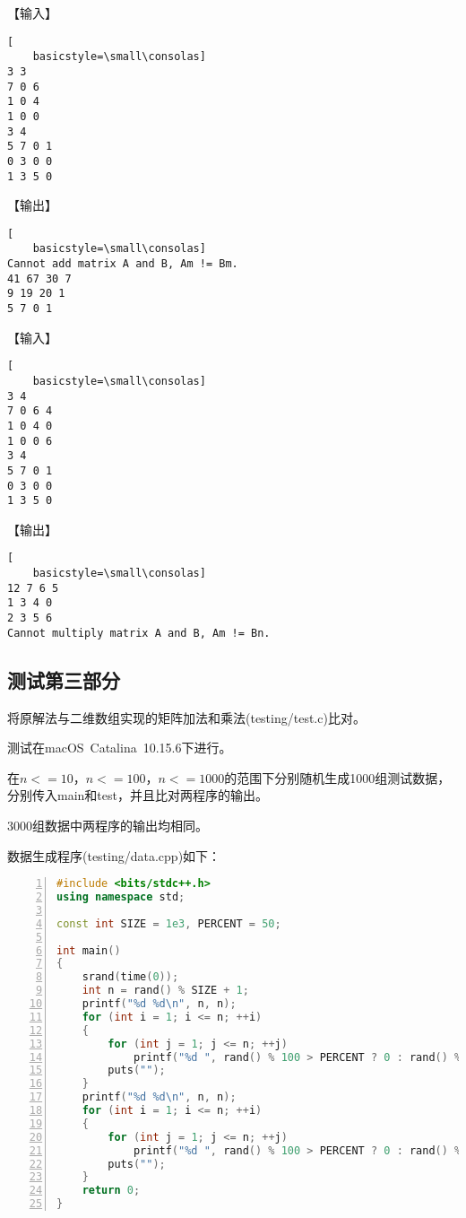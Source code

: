 \documentclass{article}
\begin{document}
【输入】

\begin{lstlisting}[
    basicstyle=\small\consolas]
3 3
7 0 6
1 0 4
1 0 0
3 4
5 7 0 1
0 3 0 0
1 3 5 0
\end{lstlisting}

【输出】

\begin{lstlisting}[
    basicstyle=\small\consolas]
Cannot add matrix A and B, Am != Bm.
41 67 30 7 
9 19 20 1 
5 7 0 1 
\end{lstlisting}

【输入】

\begin{lstlisting}[
    basicstyle=\small\consolas]
3 4
7 0 6 4
1 0 4 0
1 0 0 6
3 4
5 7 0 1
0 3 0 0
1 3 5 0
\end{lstlisting}

【输出】

\begin{lstlisting}[
    basicstyle=\small\consolas]
12 7 6 5 
1 3 4 0 
2 3 5 6 
Cannot multiply matrix A and B, Am != Bn.
\end{lstlisting}

\subsection{测试第三部分}

将原解法与二维数组实现的矩阵加法和乘法(testing/test.c)比对。

测试在macOS\ Catalina\ 10.15.6下进行。

在$n<=10$，$n<=100$，$n<=1000$的范围下分别随机生成1000组测试数据，分别传入main和test，并且比对两程序的输出。

3000组数据中两程序的输出均相同。

数据生成程序(testing/data.cpp)如下：

\begin{lstlisting}[language={C++},
    numbers=left,
    numberstyle=\tiny\consolas,
    basicstyle=\small\consolas]
#include <bits/stdc++.h>
using namespace std;

const int SIZE = 1e3, PERCENT = 50;

int main()
{
    srand(time(0));
    int n = rand() % SIZE + 1;
    printf("%d %d\n", n, n);
    for (int i = 1; i <= n; ++i)
    {
        for (int j = 1; j <= n; ++j)
            printf("%d ", rand() % 100 > PERCENT ? 0 : rand() % 1000 + 1);
        puts("");
    }
    printf("%d %d\n", n, n);
    for (int i = 1; i <= n; ++i)
    {
        for (int j = 1; j <= n; ++j)
            printf("%d ", rand() % 100 > PERCENT ? 0 : rand() % 1000 + 1);
        puts("");
    }
    return 0;
}
\end{lstlisting}
\end{document}

